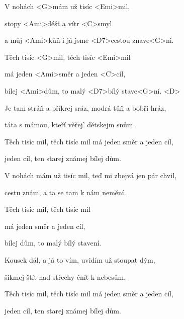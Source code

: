 

\zs
V nohách <G>mám už tisíc <Emi>mil,

stopy <Ami>déšť a vítr <C>smyl

a můj <Ami>kůň i já jsme <D7>cestou znave<G>ni.
\ks

\zr
Těch tisíc <G>mil, těch tisíc <Emi>mil

má jeden <Ami>směr a jeden <C>cíl,

bílej <Ami>dům, to malý <D7>bílý stave<G>ní. <D>
\kr

\zs
Je tam stráň a příkrej sráz, modrá tůň a bobří hráz,

táta s mámou, kteří věřej' dětskejm snům.
\ks

\zr
Těch tisíc mil, těch tisíc mil má jeden směr a jeden cíl,

jeden cíl, ten starej známej bílej dům.
\kr

\zs
V nohách mám už tisíc mil, teď mi zbejvá jen pár chvil,

cestu znám, a ta se tam k nám nemění.
\ks

\zr
Těch tisíc mil, těch tisíc mil

má jeden směr a jeden cíl,

bílej dům, to malý bílý stavení. 
\kr

\zs
Kousek dál, a já to vím, uvidím už stoupat dým,

šikmej štít nad střechy čnít k nebesům.
\ks

\zr
Těch tisíc mil, těch tisíc mil má jeden směr a jeden cíl,

jeden cíl, ten starej známej bílej dům.
\kr

\kp

